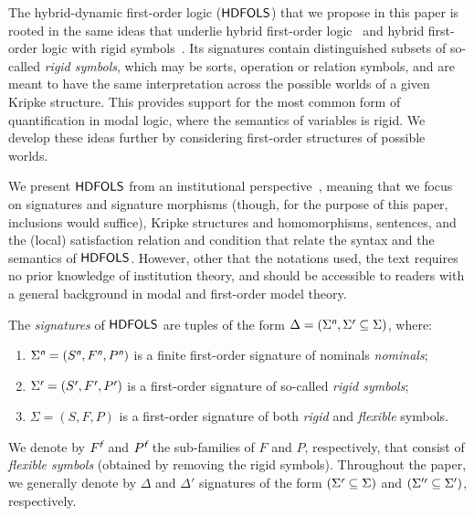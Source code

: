 \documentclass[a4paper,UKenglish,cleveref,autoref]{lipics-v2019}
\begin{document}
The hybrid-dynamic first-order logic (${\mathsf{HDFOLS}}$) that we propose in this paper is rooted in the same ideas that underlie hybrid first-order logic~\cite{Brauner11} and hybrid first-order logic with rigid symbols~\cite{DiaconescuM16,Diaconescu16}. 
Its signatures contain distinguished subsets of so-called \emph{rigid symbols}, which may be sorts, operation or relation symbols, and are meant to have the same interpretation across the possible worlds of a given Kripke structure.
This provides support for the most common form of quantification in modal logic, where the semantics of variables is rigid.
We develop these ideas further by considering first-order structures of possible worlds.

We present ${\mathsf{HDFOLS}}$ from an institutional perspective~\cite{GoguenB92}, meaning that we focus on signatures and signature morphisms (though, for the purpose of this paper, inclusions would suffice), Kripke structures and homomorphisms, sentences, and the (local) satisfaction relation and condition that relate the syntax and the semantics of ${\mathsf{HDFOLS}}$.
However, other that the notations used, the text requires no prior knowledge of institution theory, and should be accessible to readers with a general background in modal and first-order model theory.

The \emph{signatures} of ${\mathsf{HDFOLS}}$ are tuples of the form $\Delta = (\Sigma^{\text{\normalfont\sffamily\itshape n}}, \Sigma^{\text{\normalfont\sffamily\itshape r}} \subseteq \Sigma)$, where:
\begin{enumerate}
 \item $\Sigma^{\text{\normalfont\sffamily\itshape n}} = (S^{\text{\normalfont\sffamily\itshape n}},F^{\text{\normalfont\sffamily\itshape n}}, P^{\text{\normalfont\sffamily\itshape n}})$ is a finite first-order signature of nominals \emph{nominals};
  
 \item $\Sigma^{\text{\normalfont\sffamily\itshape r}} = (S^{\text{\normalfont\sffamily\itshape r}}, F^{\text{\normalfont\sffamily\itshape r}}, P^{\text{\normalfont\sffamily\itshape r}})$ is a first-order signature of so-called \emph{rigid symbols};
  
 \item $\Sigma = (S, F, P)$ is a first-order signature of both \emph{rigid} and \emph{flexible} symbols.
  
\end{enumerate}
We denote by $F^{\text{\normalfont\sffamily\itshape f}}$ and $P^{\text{\normalfont\sffamily\itshape f}}$ the sub-families of $F$ and $P$, respectively, that consist of \emph{flexible symbols} (obtained by removing the rigid symbols).
Throughout the paper, we generally denote by $\Delta$ and $\Delta'$ signatures of the form $(\Sigma^{\text{\normalfont\sffamily\itshape r}} \subseteq \Sigma)$ and $(\Sigma'^{\text{\normalfont\sffamily\itshape r}} \subseteq \Sigma')$, respectively.
\end{document}
